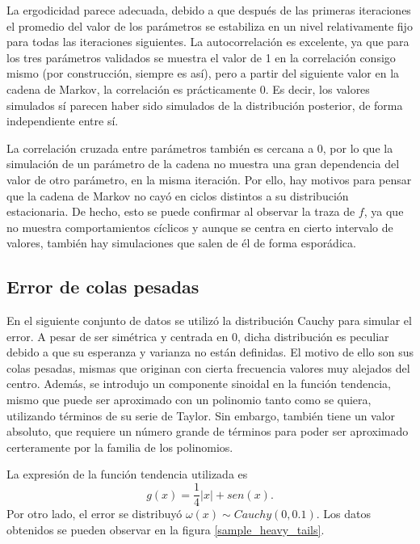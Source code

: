 La ergodicidad parece adecuada, debido a que después de las primeras iteraciones el promedio del valor de los par\'ametros se estabiliza en un nivel relativamente fijo para todas las iteraciones siguientes. La autocorrelaci\'on es excelente, ya que para los tres par\'ametros validados se muestra el valor de 1 en la correlaci\'on consigo mismo (por construcci\'on, siempre es as\'i), pero a partir del siguiente valor en la cadena de Markov, la correlaci\'on es pr\'acticamente 0. Es decir, los valores simulados s\'i parecen haber sido simulados de la distribuci\'on posterior, de forma independiente entre s\'i.

La correlaci\'on cruzada entre par\'ametros tambi\'en es cercana a 0, por lo que la simulaci\'on de un par\'ametro de la cadena no muestra una gran dependencia del valor de otro par\'ametro, en la misma iteraci\'on. Por ello, hay motivos para pensar que la cadena de Markov no cay\'o en ciclos distintos a su distribuci\'on estacionaria. De hecho, esto se puede confirmar al observar la traza de $f$, ya que no muestra comportamientos c\'iclicos y aunque se centra en cierto intervalo de valores, tambi\'en hay simulaciones que salen de \'el de forma espor\'adica.

\subsection{Error de colas pesadas}

En el siguiente conjunto de datos se utiliz\'o la distribuci\'on Cauchy para simular el error. A pesar de ser sim\'etrica y centrada en 0, dicha distribuci\'on es peculiar debido a que su esperanza y varianza no est\'an definidas. El motivo de ello son sus colas pesadas, mismas que originan con cierta frecuencia valores muy alejados del centro. Adem\'as, se introdujo un componente sinoidal en la funci\'on tendencia, mismo que puede ser aproximado con un polinomio tanto como se quiera, utilizando t\'erminos de su serie de Taylor. Sin embargo, tambi\'en tiene un valor absoluto, que requiere un n\'umero grande de t\'erminos para poder ser aproximado certeramente por la familia de los polinomios.

La expresi\'on de la funci\'on tendencia utilizada es \begin{equation*}
    g(x) = \frac{1}{4}|x| + sen(x).
\end{equation*}
Por otro lado, el error se distribuy\'o $\omega(x) \sim Cauchy(0,0.1)$. Los datos obtenidos se pueden observar en la figura \ref{sample_heavy_tails}.

